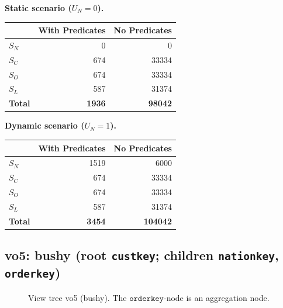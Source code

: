 \smallskip
\noindent\textbf{Static scenario ($U_N = 0$).}
\begin{center}
\begin{tabular}{lrr}
\toprule
& With Predicates & No Predicates \\
\midrule
$S_N$ & 0 & 0 \\
$S_C$ & 674 & 33334 \\
$S_O$ & 674 & 33334 \\
$S_L$ & 587 & 31374 \\
\midrule
\textbf{Total} & \textbf{1936} & \textbf{98042} \\
\bottomrule
\end{tabular}
\end{center}

\smallskip
\noindent\textbf{Dynamic scenario ($U_N = 1$).}
\begin{center}
\begin{tabular}{lrr}
\toprule
& With Predicates & No Predicates \\
\midrule
$S_N$ & 1519 & 6000 \\
$S_C$ & 674 & 33334 \\
$S_O$ & 674 & 33334 \\
$S_L$ & 587 & 31374 \\
\midrule
\textbf{Total} & \textbf{3454} & \textbf{104042} \\
\bottomrule
\end{tabular}
\end{center}

\subsection{vo5: bushy (root \texttt{custkey}; children \texttt{nationkey}, \texttt{orderkey})}

\begin{figure}[ht]
\centering
{}
\caption{View tree vo5 (bushy). The $\texttt{orderkey}$-node is an aggregation node.}
\label{fig:vo5}
\end{figure}

